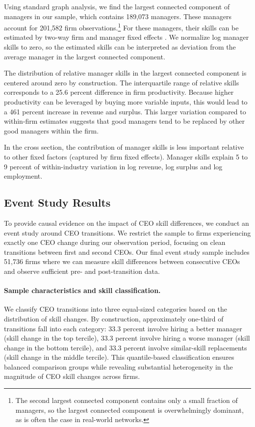 \documentclass[11pt,a4paper]{article}
\begin{document}
Using standard graph analysis, we find the largest connected component of managers in our sample, which contains 189,073 managers. These managers account for 201,582 firm observations.\footnote{The second largest connected component contains only a small fraction of managers, so the largest connected component is overwhelmingly dominant, as is often the case in real-world networks.} For these managers, their skills can be estimated by two-way firm and manager fixed effects \citep{Abowd1999Econometrica,reghdfe}. We normalize log manager skills to zero, so the estimated skills can be interpreted as deviation from the average manager in the largest connected component. 

The distribution of relative manager skills in the largest connected component is centered around zero by construction. The interquartile range of relative skills corresponds to a 25.6 percent difference in firm productivity. Because higher productivity can be leveraged by buying more variable inputs, this would lead to a 461 percent increase in revenue and surplus. This larger variation compared to within-firm estimates suggests that good managers tend to be replaced by other good managers within the firm. 

In the cross section, the contribution of manager skills is less important relative to other fixed factors (captured by firm fixed effects). Manager skills explain 5 to 9 percent of within-industry variation in log revenue, log surplus and log employment.

\subsection{Event Study Results}

To provide causal evidence on the impact of CEO skill differences, we conduct an event study around CEO transitions. We restrict the sample to firms experiencing exactly one CEO change during our observation period, focusing on clean transitions between first and second CEOs. Our final event study sample includes 51,736 firms where we can measure skill differences between consecutive CEOs and observe sufficient pre- and post-transition data.

\paragraph{Sample characteristics and skill classification.} We classify CEO transitions into three equal-sized categories based on the distribution of skill changes. By construction, approximately one-third of transitions fall into each category: 33.3 percent involve hiring a better manager (skill change in the top tercile), 33.3 percent involve hiring a worse manager (skill change in the bottom tercile), and 33.3 percent involve similar-skill replacements (skill change in the middle tercile). This quantile-based classification ensures balanced comparison groups while revealing substantial heterogeneity in the magnitude of CEO skill changes across firms.
\end{document}
